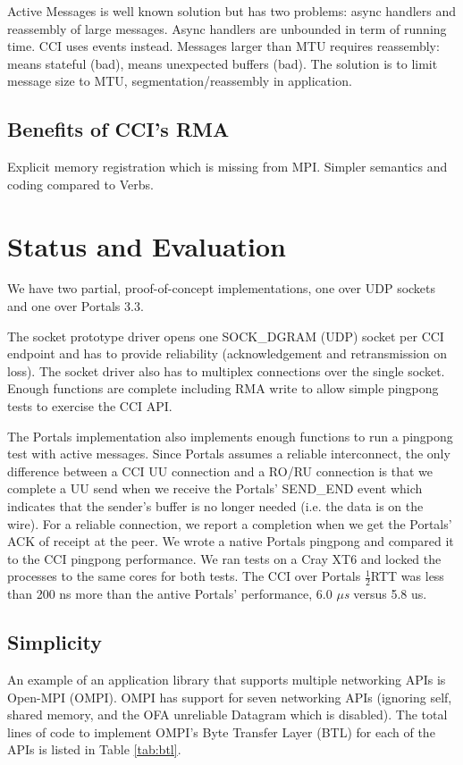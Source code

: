 \documentclass[conference]{IEEEtran}
\begin{document}
Active Messages is well known solution but has two problems: async handlers and reassembly
of large messages.  Async handlers are unbounded in term of running time. CCI uses events
instead.  Messages larger than MTU requires reassembly: means stateful (bad), means
unexpected buffers (bad). The solution is to limit message size to MTU,
segmentation/reassembly in application.


\subsection{Benefits of CCI's RMA}
 Explicit memory registration which is missing from MPI. Simpler semantics and coding compared to Verbs.

\section{Status and Evaluation}
We have two partial, proof-of-concept implementations, one over UDP sockets and
one over Portals 3.3.

The socket prototype driver opens one SOCK\_DGRAM (UDP) socket per CCI endpoint
and has to provide reliability (acknowledgement and retransmission on loss).
The socket driver also has to multiplex connections over the single socket.
Enough functions are complete including RMA write to allow simple pingpong
tests to exercise the CCI API.

The Portals implementation also implements enough functions to run a pingpong
test with active messages. Since Portals assumes a reliable interconnect, the
only difference between a CCI UU connection and a RO/RU connection is that we
complete a UU send when we receive the Portals' SEND\_END event which indicates
that the sender's buffer is no longer needed (i.e. the data is on the wire).
For a reliable connection, we report a completion when we get the Portals' ACK
of receipt at the peer. We wrote a native Portals pingpong and compared it to
the CCI pingpong performance. We ran tests on a Cray XT6 and locked the
processes to the same cores for both tests. The CCI over Portals
\begin{math}\frac{1}{2}\end{math}RTT was less than 200 ns more than the antive
Portals' performance, 6.0 $\mu$\textit{s} versus 5.8 us.

\subsection{Simplicity} An example of an application library that supports
multiple networking APIs is Open-MPI (OMPI). OMPI has support for seven
networking APIs (ignoring self, shared memory, and the OFA unreliable Datagram
which is disabled). The total lines of code to implement OMPI's Byte Transfer
Layer (BTL) for each of the APIs is listed in Table \ref{tab:btl}.
\end{document}
